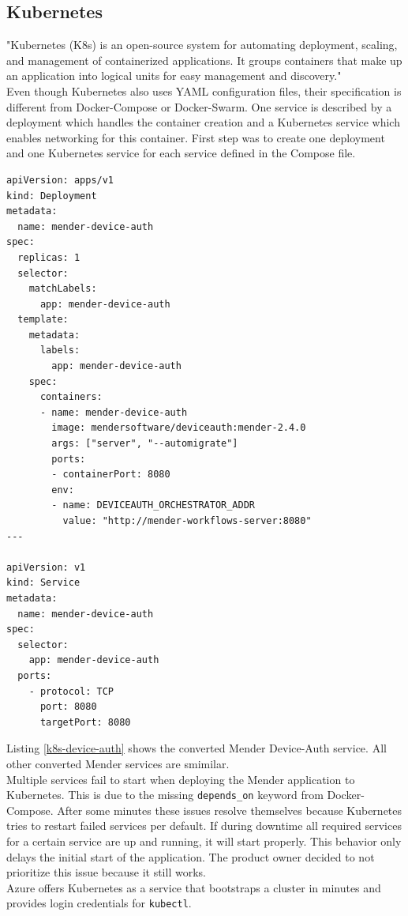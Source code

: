 \subsection{Kubernetes}
"Kubernetes (K8s) is an open-source system for automating deployment, scaling, and management of containerized applications.
It groups containers that make up an application into logical units for easy management and discovery."\cite{k8s}\\
Even though Kubernetes also uses YAML configuration files, their specification is different from Docker-Compose or Docker-Swarm. One service is described by a deployment which handles the container creation and a Kubernetes service which enables networking for this container. First step was to create one deployment and one Kubernetes service for each service defined in the Compose file.
\begin{code}
  \label{k8s-device-auth}
  \begin{verbatim}
apiVersion: apps/v1
kind: Deployment
metadata:
  name: mender-device-auth
spec:
  replicas: 1
  selector:
    matchLabels:
      app: mender-device-auth
  template:
    metadata:
      labels:
        app: mender-device-auth
    spec:
      containers:
      - name: mender-device-auth
        image: mendersoftware/deviceauth:mender-2.4.0
        args: ["server", "--automigrate"]
        ports:
        - containerPort: 8080
        env:
        - name: DEVICEAUTH_ORCHESTRATOR_ADDR
          value: "http://mender-workflows-server:8080"
---

apiVersion: v1
kind: Service
metadata:
  name: mender-device-auth
spec:
  selector:
    app: mender-device-auth
  ports:
    - protocol: TCP
      port: 8080
      targetPort: 8080
  \end{verbatim}
\end{code}
Listing \ref{k8s-device-auth} shows the converted Mender Device-Auth service. All other converted Mender services are smimilar.\\
Multiple services fail to start when deploying the Mender application to Kubernetes. This is due to the missing \verb|depends_on| keyword from Docker-Compose. After some minutes these issues resolve themselves because Kubernetes tries to restart failed services per default. If during downtime all required services for a certain service are up and running, it will start properly. This behavior only delays the initial start of the application. The product owner decided to not prioritize this issue because it still works.\\
Azure offers Kubernetes as a service that bootstraps a cluster in minutes and provides login credentials for \verb|kubectl|.


